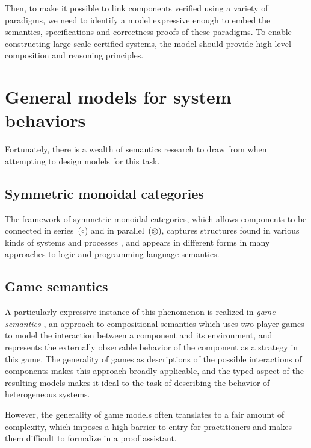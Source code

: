 \documentclass[draft,11pt]{report}
\begin{document}
Then,
to make it possible to link components
verified using a variety of paradigms,
we need to identify a model
expressive enough to embed
the semantics, specifications and correctness proofs
of these paradigms.
To enable constructing large-scale certified systems,
the model should provide
high-level composition and reasoning principles.



\section{General models for system behaviors} %
\label{ssec:genmodel}

Fortunately,
there is a wealth of semantics research to draw from
when attempting to design models for this task.

\subsection{Symmetric monoidal categories}

The framework of
symmetric monoidal categories,
which allows components to be
connected in series~($\circ$) and in parallel~($\otimes$),
captures structures found
in various kinds of systems and processes \citep{rosetta},
and appears in different forms
in many approaches to logic and programming language semantics.

\subsection{Game semantics}

A particularly expressive instance of this phenomenon
is realized in \emph{game semantics} \citep{cspgs},
an approach to compositional semantics
which uses two-player games to model
the interaction between a component and its environment,
and represents the externally observable behavior
of the component as a strategy in this game.
The generality of games as
descriptions of the possible interactions of components
makes this approach broadly applicable,
and the typed aspect of the resulting models
makes it ideal to the task of
describing the behavior of heterogeneous systems.

However,
the generality of game models
often translates to a fair amount of complexity,
which imposes a high barrier to entry for practitioners
and makes them difficult to formalize in a proof assistant.
\end{document}
